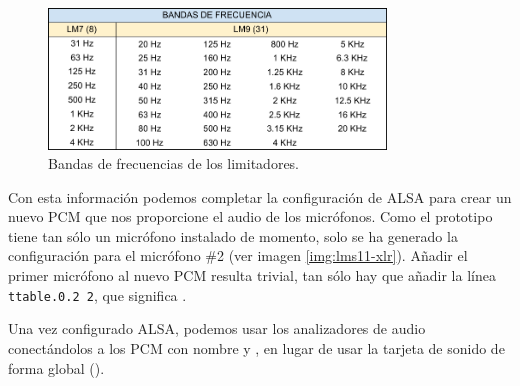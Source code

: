 \begin{figure}[ht]
    \centering
    \includegraphics[width=0.8\textwidth]{figuras/lms-frecuencias.pdf}
    \caption{Bandas de frecuencias de los limitadores.}
    \label{fig:lms-freq}
\end{figure}

Con esta información podemos completar la configuración de \acrshort{ALSA} para crear un nuevo \acrshort{PCM} que nos proporcione el audio de los micrófonos. Como el prototipo tiene tan sólo un micrófono instalado de momento, solo se ha generado la configuración para el micrófono \#2 (ver imagen \ref{img:lms11-xlr}). Añadir el primer micrófono al nuevo \acrshort{PCM} resulta trivial, tan sólo hay que añadir la línea \texttt{ttable.0.2 2}, que significa .

Una vez configurado \acrshort{ALSA}, podemos usar los analizadores de audio conectándolos a los \acrshort{PCM} con nombre  y , en lugar de usar la tarjeta de sonido de forma global ().

\newpage

